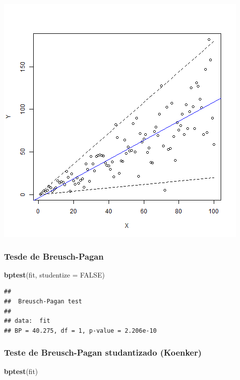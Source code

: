 \documentclass[a4paper, 12pt]{article}
\newenvironment{Shaded}{\begin{snugshade}}{\end{snugshade}}
\newcommand{\DataTypeTok}[1]{\textcolor[rgb]{0.13,0.29,0.53}{#1}}
\newcommand{\KeywordTok}[1]{\textcolor[rgb]{0.13,0.29,0.53}{\textbf{#1}}}
\newcommand{\NormalTok}[1]{#1}
\newcommand{\OtherTok}[1]{\textcolor[rgb]{0.56,0.35,0.01}{#1}}
\begin{document}
\begin{center}\includegraphics[width=0.9\linewidth]{images/hetero-1} \end{center}

\hypertarget{tesde-de-breusch-pagan}{%
\subsubsection{Tesde de Breusch-Pagan}\label{tesde-de-breusch-pagan}}

\begin{Shaded}
\begin{Highlighting}[]
\KeywordTok{bptest}\NormalTok{(fit, }\DataTypeTok{studentize =} \OtherTok{FALSE}\NormalTok{)}
\end{Highlighting}
\end{Shaded}

\begin{verbatim}
## 
##  Breusch-Pagan test
## 
## data:  fit
## BP = 40.275, df = 1, p-value = 2.206e-10
\end{verbatim}

\hypertarget{teste-de-breusch-pagan-studantizado-koenker}{%
\subsubsection{Teste de Breusch-Pagan studantizado
(Koenker)}\label{teste-de-breusch-pagan-studantizado-koenker}}

\begin{Shaded}
\begin{Highlighting}[]
\KeywordTok{bptest}\NormalTok{(fit)}
\end{Highlighting}
\end{Shaded}
\end{document}
